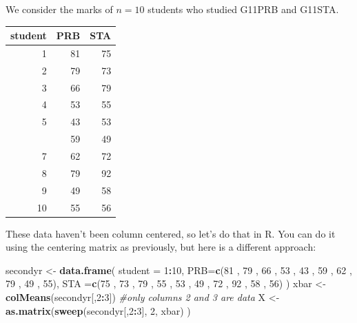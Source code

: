 \documentclass[
]{book}
\newenvironment{Shaded}{\begin{snugshade}}{\end{snugshade}}
\newcommand{\AttributeTok}[1]{\textcolor[rgb]{0.13,0.29,0.53}{#1}}
\newcommand{\CommentTok}[1]{\textcolor[rgb]{0.56,0.35,0.01}{\textit{#1}}}
\newcommand{\DecValTok}[1]{\textcolor[rgb]{0.00,0.00,0.81}{#1}}
\newcommand{\FunctionTok}[1]{\textcolor[rgb]{0.13,0.29,0.53}{\textbf{#1}}}
\newcommand{\NormalTok}[1]{#1}
\newcommand{\OtherTok}[1]{\textcolor[rgb]{0.56,0.35,0.01}{#1}}
\newcommand{\SpecialCharTok}[1]{\textcolor[rgb]{0.81,0.36,0.00}{\textbf{#1}}}
\theoremstyle{definition}
\theoremstyle{definition}
\theoremstyle{definition}
\theoremstyle{definition}
\theoremstyle{remark}
\begin{document}
We consider the marks of \(n=10\) students who studied G11PRB and G11STA.

\begin{table}
\centering
\begin{tabular}{rrr}
\toprule
student & PRB & STA\\
\midrule
1 & 81 & 75\\
2 & 79 & 73\\
3 & 66 & 79\\
4 & 53 & 55\\
5 & 43 & 53\\
\addlinespace
6 & 59 & 49\\
7 & 62 & 72\\
8 & 79 & 92\\
9 & 49 & 58\\
10 & 55 & 56\\
\bottomrule
\end{tabular}
\end{table}

These data haven't been column centered, so let's do that in R. You can do it using the centering matrix as previously, but here is a different approach:

\begin{Shaded}
\begin{Highlighting}[]
\NormalTok{secondyr }\OtherTok{\textless{}{-}} \FunctionTok{data.frame}\NormalTok{(}
  \AttributeTok{student =} \DecValTok{1}\SpecialCharTok{:}\DecValTok{10}\NormalTok{,}
\AttributeTok{PRB=}\FunctionTok{c}\NormalTok{(}\DecValTok{81}\NormalTok{ , }\DecValTok{79}\NormalTok{ , }\DecValTok{66}\NormalTok{ , }\DecValTok{53}\NormalTok{ , }\DecValTok{43}\NormalTok{ , }\DecValTok{59}\NormalTok{ , }\DecValTok{62}\NormalTok{ , }\DecValTok{79}\NormalTok{ , }\DecValTok{49}\NormalTok{ , }\DecValTok{55}\NormalTok{),}
\AttributeTok{STA =}\FunctionTok{c}\NormalTok{(}\DecValTok{75}\NormalTok{ , }\DecValTok{73}\NormalTok{ , }\DecValTok{79}\NormalTok{ , }\DecValTok{55}\NormalTok{ , }\DecValTok{53}\NormalTok{ , }\DecValTok{49}\NormalTok{ , }\DecValTok{72}\NormalTok{ , }\DecValTok{92}\NormalTok{ , }\DecValTok{58}\NormalTok{ , }\DecValTok{56}\NormalTok{)}
\NormalTok{        )}
\NormalTok{xbar }\OtherTok{\textless{}{-}} \FunctionTok{colMeans}\NormalTok{(secondyr[,}\DecValTok{2}\SpecialCharTok{:}\DecValTok{3}\NormalTok{]) }\CommentTok{\#only columns 2 and 3 are data}
\NormalTok{X }\OtherTok{\textless{}{-}} \FunctionTok{as.matrix}\NormalTok{(}\FunctionTok{sweep}\NormalTok{(secondyr[,}\DecValTok{2}\SpecialCharTok{:}\DecValTok{3}\NormalTok{], }\DecValTok{2}\NormalTok{, xbar) ) }
\end{Highlighting}
\end{Shaded}
\end{document}
